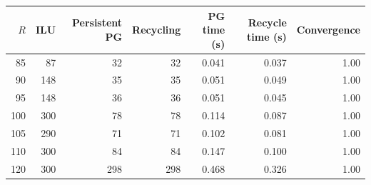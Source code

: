 \begin{tabular}{rrrrrrr}
\toprule
$R$ & ILU & Persistent PG & Recycling & PG time (s) & Recycle time (s) & Convergence \\
\midrule
85  & 87  & 32  & 32  & 0.041 & 0.037 & 1.00 \\
90  & 148 & 35  & 35  & 0.051 & 0.049 & 1.00 \\
95  & 148 & 36  & 36  & 0.051 & 0.045 & 1.00 \\
100 & 300 & 78  & 78  & 0.114 & 0.087 & 1.00 \\
105 & 290 & 71  & 71  & 0.102 & 0.081 & 1.00 \\
110 & 300 & 84  & 84  & 0.147 & 0.100 & 1.00 \\
120 & 300 & 298 & 298 & 0.468 & 0.326 & 1.00 \\
\bottomrule
\end{tabular}
